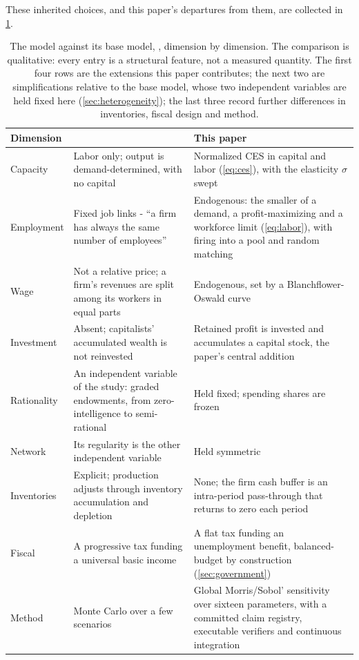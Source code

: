 These inherited choices, and this paper's departures from them, are collected in \cref{tab:teglio}.

\begin{table}[htbp]
\centering
\small
\caption{The model against its base model, \citet{Teglio2025}, dimension by dimension. The comparison is qualitative: every entry is a structural feature, not a measured quantity. The first four rows are the extensions this paper contributes; the next two are simplifications relative to the base model, whose two independent variables are held fixed here (\cref{sec:heterogeneity}); the last three record further differences in inventories, fiscal design and method.}
\label{tab:teglio}
\begin{tabularx}{\textwidth}{@{}l
    >{\raggedright\arraybackslash}X >{\raggedright\arraybackslash}X@{}}
\toprule
Dimension & \citet{Teglio2025} & This paper \\
\midrule
Capacity & Labor only; output is demand-determined, with no capital & Normalized CES in capital and labor (\cref{eq:ces}), with the elasticity $\sigma$ swept \\ Employment & Fixed job links - ``a firm has always the same number of employees'' & Endogenous: the smaller of a demand, a profit-maximizing and a workforce limit (\cref{eq:labor}), with firing into a pool and random matching \\ Wage & Not a relative price; a firm's revenues are split among its workers in equal parts & Endogenous, set by a Blanchflower-Oswald curve \\ Investment & Absent; capitalists' accumulated wealth is not reinvested & Retained profit is invested and accumulates a capital stock, the paper's central addition \\ Rationality & An independent variable of the study: graded endowments, from zero-intelligence to semi-rational & Held fixed; spending shares are frozen \\ Network & Its regularity is the other independent variable & Held symmetric \\ Inventories & Explicit; production adjusts through inventory accumulation and depletion & None; the firm cash buffer is an intra-period pass-through that returns to zero each period \\ Fiscal & A progressive tax funding a universal basic income & A flat tax funding an unemployment benefit, balanced-budget by construction (\cref{sec:government}) \\
Method & Monte Carlo over a few scenarios & Global Morris/Sobol' sensitivity over sixteen parameters, with a committed claim registry, executable verifiers and continuous integration \\
\bottomrule
\end{tabularx}
\end{table}

